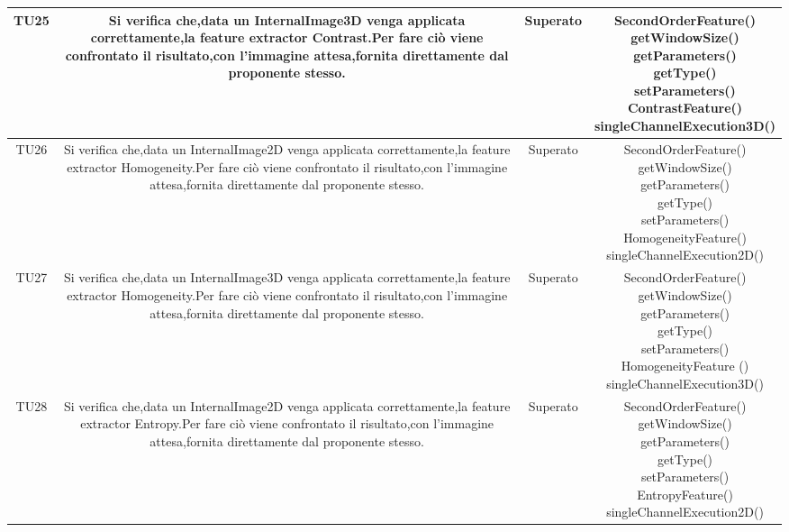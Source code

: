 \begin{center}
\begin{longtable}{|c|c|c|c|}
\hline
TU25 & \parbox[t]{\larghezza}{ Si verifica che,data un InternalImage3D venga applicata correttamente,la feature extractor Contrast.Per fare ciò viene confrontato il risultato,con l'immagine attesa,fornita direttamente dal proponente stesso. } & Superato & \parbox[t]{\dimTipo} { SecondOrderFeature() \\ getWindowSize() \\ getParameters() \\ getType() \\ setParameters() \\ ContrastFeature() \\ singleChannelExecution3D() \\ } \\
\hline
TU26 & \parbox[t]{\larghezza}{ Si verifica che,data un InternalImage2D venga applicata correttamente,la feature extractor Homogeneity.Per fare ciò viene confrontato il risultato,con l'immagine attesa,fornita direttamente dal proponente stesso. } & Superato & \parbox[t]{\dimTipo} { SecondOrderFeature() \\ getWindowSize() \\ getParameters() \\ getType() \\ setParameters() \\ HomogeneityFeature() \\ singleChannelExecution2D() \\ } \\
\hline
TU27 & \parbox[t]{\larghezza}{ Si verifica che,data un InternalImage3D venga applicata correttamente,la feature extractor Homogeneity.Per fare ciò viene confrontato il risultato,con l'immagine attesa,fornita direttamente dal proponente stesso. } & Superato & \parbox[t]{\dimTipo} { SecondOrderFeature() \\ getWindowSize() \\ getParameters() \\ getType() \\ setParameters() \\ HomogeneityFeature () \\ singleChannelExecution3D() \\ } \\
\hline
TU28 & \parbox[t]{\larghezza}{ Si verifica che,data un InternalImage2D venga applicata correttamente,la feature extractor Entropy.Per fare ciò viene confrontato il risultato,con l'immagine attesa,fornita direttamente dal proponente stesso. } & Superato & \parbox[t]{\dimTipo} { SecondOrderFeature() \\ getWindowSize() \\ getParameters() \\ getType() \\ setParameters() \\ EntropyFeature() \\ singleChannelExecution2D() \\ } \\

\end{longtable}
\end{center}
